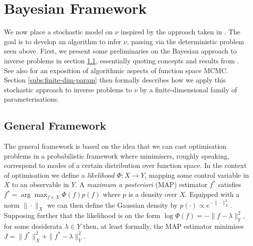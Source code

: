 \documentclass[runningheads]{llncs}
\begin{document}


\section{Bayesian Framework}\label{sec:bayesian}

We now place a stochastic model on $\nu$ inspired by the approach taken in
\cite{cotter2013bayesian}. The goal is to develop an algorithm to infer $\nu$,
passing via the deterministic problem seen above.  First, we present some
preliminaries on the Bayesian approach to inverse problems in section
\ref{subs:gf}, essentially quoting concepts and results from
\cite{dashti2017bayesian}. See also \cite{cotter2013mcmc} for an exposition of
algorithmic aspects of function space MCMC. Section \ref{subs:finite-dim-param}
then formally describes how we apply this stochastic approach to inverse
problems to $\nu$ by a finite-dimensional family of parameterisations.

\subsection{General Framework}\label{subs:gf}

The general framework is based on the idea that we can cast optimisation
problems in a probabilistic framework where minimisers, roughly speaking,
correspond to modes of a certain distribution over function space.  In the
context of optimisation we define a \emph{likelihood} $\Phi : X\rightarrow Y$,
mapping some control variable in $X$ to an observable in $Y$.  A \emph{maximum a
posteriori} (MAP) estimator $f^*$ satisfies $f^* = \arg\max_{f\in X} \Phi(f)
p(f)$ where $p$ is a density over $X$. Equipped with a norm $\|\cdot\|_X$ we can
then define the Gaussian density by $p(\cdot) \propto e^{-\|\cdot\|_X^2}$.
Supposing further that the likelihood is on the form $\log \Phi(f) =
-\|f-\lambda\|_Y^2$, for some desiderata $\lambda\in Y$ then, at least formally,
the MAP estimator minimises $J=\|f^*\|_X^2 + \|f^*-\lambda\|_Y^2$.\\
\end{document}
